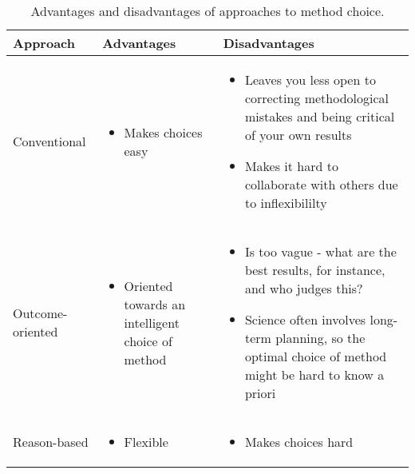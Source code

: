 \begin{table}[!ht]
	\centering
	\begin{tabular}{| l | p{2in} | p{2in} |}
		\hline
		\textbf{Approach} & \textbf{Advantages} & \textbf{Disadvantages} \\
		\hline
		Conventional      & \begin{itemize}[topsep = 0pt, itemsep = 0pt, partopsep = 0pt, parsep = 0pt, leftmargin = 12pt]
			\item Makes choices easy
		\end{itemize} & \begin{itemize}[topsep = 0pt, itemsep = 0pt, partopsep = 0pt, parsep = 0pt, leftmargin = 12pt]
			\item Leaves you less open to correcting methodological mistakes and being critical of your own results
			\item Makes it hard to collaborate with others due to inflexibililty
	    \end{itemize} \\
    	\hline
    	Outcome-oriented & \begin{itemize}[topsep = 0pt, itemsep = 0pt, partopsep = 0pt, parsep = 0pt, leftmargin = 12pt]
    		\item Oriented towards an intelligent choice of method
    	\end{itemize} & \begin{itemize}[topsep = 0pt, itemsep = 0pt, partopsep = 0pt, parsep = 0pt, leftmargin = 12pt]
    		\item Is too vague - what are the best results, for instance, and who judges this?
    		\item Science often involves long-term planning, so the optimal choice of method might be hard to know a priori
	    \end{itemize} \\
    	\hline
    	Reason-based & \begin{itemize}[topsep = 0pt, itemsep = 0pt, partopsep = 0pt, parsep = 0pt, leftmargin = 12pt]
    		\item Flexible
    	\end{itemize} & \begin{itemize}[topsep = 0pt, itemsep = 0pt, partopsep = 0pt, parsep = 0pt, leftmargin = 12pt]
    		\item Makes choices hard
    	\end{itemize} \\
    	\hline
	\end{tabular}
	\caption{Advantages and disadvantages of approaches to method choice.}
	\label{tab:methodChoiceComp}
\end{table}

